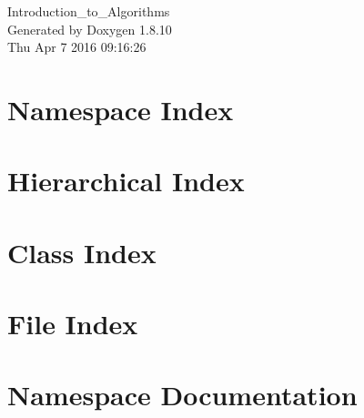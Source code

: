 \documentclass[twoside]{book}
\newcommand{\+}{\discretionary{\mbox{\scriptsize$\hookleftarrow$}}{}{}}
\newcommand{\clearemptydoublepage}{%
  \newpage{\pagestyle{empty}\cleardoublepage}%
}
\begin{document}
\hypersetup{pageanchor=false,
             bookmarks=true,
             bookmarksnumbered=true,
             pdfencoding=unicode
            }
\begin{titlepage}
\vspace*{7cm}
\begin{center}%
{\Large Introduction\+\_\+to\+\_\+\+Algorithms }\\
\vspace*{1cm}
{\large Generated by Doxygen 1.8.10}\\
\vspace*{0.5cm}
{\small Thu Apr 7 2016 09:16:26}\\
\end{center}
\end{titlepage}
\clearemptydoublepage
\tableofcontents
\clearemptydoublepage
{}
\hypersetup{pageanchor=true}

\chapter{Namespace Index}

\chapter{Hierarchical Index}

\chapter{Class Index}

\chapter{File Index}

\chapter{Namespace Documentation}







\end{document}
